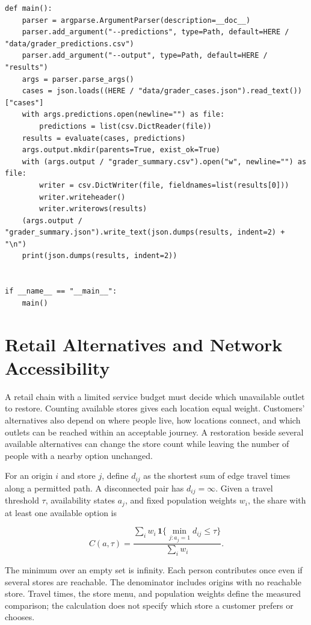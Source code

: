 \begin{Verbatim}[breaklines,breakanywhere,fontsize=\small]
def main():
    parser = argparse.ArgumentParser(description=__doc__)
    parser.add_argument("--predictions", type=Path, default=HERE / "data/grader_predictions.csv")
    parser.add_argument("--output", type=Path, default=HERE / "results")
    args = parser.parse_args()
    cases = json.loads((HERE / "data/grader_cases.json").read_text())["cases"]
    with args.predictions.open(newline="") as file:
        predictions = list(csv.DictReader(file))
    results = evaluate(cases, predictions)
    args.output.mkdir(parents=True, exist_ok=True)
    with (args.output / "grader_summary.csv").open("w", newline="") as file:
        writer = csv.DictWriter(file, fieldnames=list(results[0]))
        writer.writeheader()
        writer.writerows(results)
    (args.output / "grader_summary.json").write_text(json.dumps(results, indent=2) + "\n")
    print(json.dumps(results, indent=2))


if __name__ == "__main__":
    main()
\end{Verbatim}

\hypertarget{M05-retail-alternatives-and-network-accessibility}{%
\section{Retail Alternatives and Network
Accessibility}\label{M05-retail-alternatives-and-network-accessibility}}

\noindent \noindent A retail chain with a limited service budget must decide which
unavailable outlet to restore. Counting available stores gives each
location equal weight. Customers' alternatives also depend on where
people live, how locations connect, and which outlets can be reached
within an acceptable journey. A restoration beside several available
alternatives can change the store count while leaving the number of
people with a nearby option unchanged.

For an origin \(i\) and store \(j\), define \(d_{ij}\) as the shortest
sum of edge travel times along a permitted path. A disconnected pair has
\(d_{ij}=\infty\). Given a travel threshold \(\tau\), availability
states \(a_j\), and fixed population weights \(w_i\), the share with at
least one available option is

\[
C(a,\tau)=\frac{\sum_i w_i\,\mathbf{1}\{\min_{j:a_j=1}d_{ij}\leq\tau\}}{\sum_i w_i}.
\]

The minimum over an empty set is infinity. Each person contributes once
even if several stores are reachable. The denominator includes origins
with no reachable store. Travel times, the store menu, and population
weights define the measured comparison; the calculation does not specify
which store a customer prefers or chooses.

